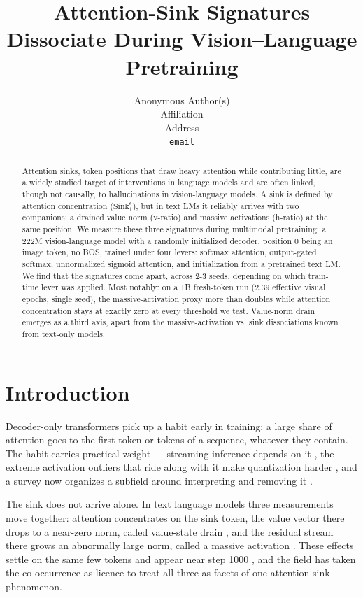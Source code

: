 \documentclass{article}
\title{Attention-Sink Signatures Dissociate During Vision--Language Pretraining}
\author{  Anonymous Author(s) \\
  Affiliation \\
  Address \\
  \texttt{email} \\
}
\begin{document}
\maketitle


\begin{abstract}
Attention sinks, token positions that draw heavy attention while contributing little, are a widely studied target of interventions in language models and are often linked, though not causally, to hallucinations in vision-language models. A sink is defined by attention concentration ($\mathrm{Sink}^{\epsilon}_{1}$), but in text LMs it reliably arrives with two companions: a drained value norm (v-ratio) and massive activations (h-ratio) at the same position. We measure these three signatures during multimodal pretraining: a 222M vision-language model with a randomly initialized decoder, position 0 being an image token, no BOS, trained under four levers: softmax attention, output-gated softmax, unnormalized sigmoid attention, and initialization from a pretrained text LM. We find that the signatures come apart, across 2-3 seeds, depending on which train-time lever was applied. Most notably: on a 1B fresh-token run (2.39 effective visual epochs, single seed), the massive-activation proxy more than doubles while attention concentration stays at exactly zero at every threshold we test. Value-norm drain emerges as a third axis, apart from the massive-activation vs. sink dissociations known from text-only models.
\end{abstract}


\section{Introduction}

Decoder-only transformers pick up a habit early in training: a large share of attention goes to the first token or tokens of a sequence, whatever they contain. The habit carries practical weight --- streaming inference depends on it \cite{ref1}, the extreme activation outliers that ride along with it make quantization harder \cite{ref2}, and a survey now organizes a subfield around interpreting and removing it \cite{ref3}.

The sink does not arrive alone. In text language models three measurements move together: attention concentrates on the sink token, the value vector there drops to a near-zero norm, called value-state drain \cite{ref4}, and the residual stream there grows an abnormally large norm, called a massive activation \cite{ref2,ref5}. These effects settle on the same few tokens \cite{ref6} and appear near step 1000 \cite{ref7}, and the field has taken the co-occurrence as licence to treat all three as facets of one attention-sink phenomenon.
\end{document}
